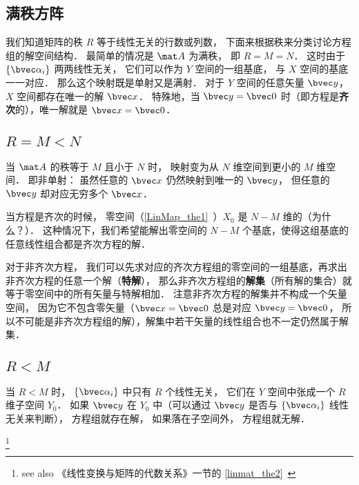 \subsection{满秩方阵}
我们知道矩阵的秩 $R$ 等于线性无关的行数或列数， 下面来根据秩来分类讨论方程组的解空间结构． 最简单的情况是 $\mat A$ 为满秩， 即 $R = M = N$． 这时由于 $\{\bvec \alpha_i\}$ 两两线性无关， 它们可以作为 $Y$ 空间的一组基底， 与 $X$ 空间的基底一一对应． 那么这个映射既是单射又是满射．%
对于 $Y$ 空间的任意矢量 $\bvec y$， $X$ 空间都存在唯一的解 $\bvec x$． 特殊地，当 $\bvec y = \bvec 0$ 时（即方程是\textbf{齐次}的），唯一解就是 $\bvec x = \bvec 0$．

\subsection{$R = M < N$}\label{LinEq_sub1}

当 $\mat A$ 的秩等于 $M$ 且小于 $N$ 时， 映射变为从 $N$ 维空间到更小的 $M$ 维空间． 即非单射： 虽然任意的 $\bvec x$ 仍然映射到唯一的 $\bvec y$， 但任意的 $\bvec y$ 却对应无穷多个 $\bvec x$． 


当方程是齐次的时候， 零空间（\autoref{LinMap_the1}~）$X_0$ 是 $N- M$ 维的（为什么？）． 这种情况下，我们希望能解出零空间的 $N - M$ 个基底，使得这组基底的任意线性组合都是齐次方程的解．

对于非齐次方程， 我们可以先求对应的齐次方程组的零空间的一组基底，再求出非齐次方程的任意一个解（\textbf{特解}）， 那么非齐次方程组的\textbf{解集}（所有解的集合）就等于零空间中的所有矢量与特解相加． 注意非齐次方程的解集并不构成一个矢量空间， 因为它不包含零矢量（$\bvec x = \bvec 0$ 总是对应 $\bvec y = \bvec 0$， 所以不可能是非齐次方程组的解），解集中若干矢量的线性组合也不一定仍然属于解集．

\subsection{$R < M$}
当 $R < M$ 时， $\{\bvec \alpha_i\}$ 中只有 $R$ 个线性无关， 它们在 $Y$ 空间中张成一个 $R$ 维子空间 $Y_0$． 如果 $\bvec y$ 在 $Y_0$ 中（可以通过 $\bvec y$ 是否与 $\{\bvec \alpha_i\}$ 线性无关来判断）， 方程组就存在解， 如果落在子空间外， 方程组就无解．

\footnote{see also 《线性变换与矩阵的代数关系》一节的 \autoref{linmat_the2}~}
